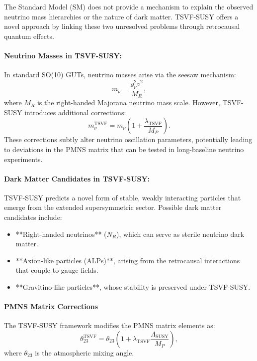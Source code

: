 \documentclass[twocolumn,superscriptaddress,floatfix]{revtex4-2}
\begin{document}
The Standard Model (SM) does not provide a mechanism to explain the observed neutrino mass hierarchies or the nature of dark matter. TSVF-SUSY offers a novel approach by linking these two unresolved problems through retrocausal quantum effects.

\paragraph{Neutrino Masses in TSVF-SUSY:}  
In standard SO(10) GUTs, neutrino masses arise via the seesaw mechanism:
\begin{equation}
m_{\nu} = \frac{y_{\nu}^2 v^2}{M_R},
\end{equation}
where $M_R$ is the right-handed Majorana neutrino mass scale. However, TSVF-SUSY introduces additional corrections:
\begin{equation}
m_{\nu}^{\text{TSVF}} = m_{\nu} \left(1 + \frac{\lambda_{\text{TSVF}}}{M_P} \right).
\label{eq:neutrino_mass_tsvf}
\end{equation}
These corrections subtly alter neutrino oscillation parameters, potentially leading to deviations in the PMNS matrix that can be tested in long-baseline neutrino experiments.

\paragraph{Dark Matter Candidates in TSVF-SUSY:}  
TSVF-SUSY predicts a novel form of stable, weakly interacting particles that emerge from the extended supersymmetric sector. Possible dark matter candidates include:
\begin{itemize}
    \item **Right-handed neutrinos** ($N_R$), which can serve as sterile neutrino dark matter.
    \item **Axion-like particles (ALPs)**, arising from the retrocausal interactions that couple to gauge fields.
    \item **Gravitino-like particles**, whose stability is preserved under TSVF-SUSY.
\end{itemize}

\paragraph{PMNS Matrix Corrections}
The TSVF-SUSY framework modifies the PMNS matrix elements as:
\begin{equation}
\theta_{23}^{\text{TSVF}} = \theta_{23} \left(1 + \lambda_{\text{TSVF}} \frac{\Lambda_{\text{SUSY}}}{M_P} \right),
\label{eq:pmns_correction}
\end{equation}
where $\theta_{23}$ is the atmospheric mixing angle.
\end{document}
